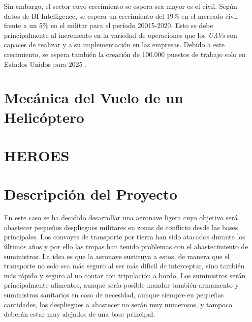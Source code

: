 Sin embargo, el sector cuyo crecimiento se espera sea mayor es el civil. Según datos de BI Intelligence, se espera un crecimiento del 19\% en el mercado civil frente a un 5\% en el militar para el período 20015-2020.
Esto se debe principalmente al incremento en la variedad de operaciones que los \emph{UAVs} son capaces de realizar y a su implementación en las empresas. Debido a este crecimiento, se espera también la creación de 100.000 puestos de trabajo solo en Estados Unidos para 2025 \cite{AUVSI}.\\

\section{Mecánica del Vuelo de un Helicóptero}


\section[\textbf{HE}licopter and \textbf{RO}tor \textbf{E}quilibrium and \textbf{S}tability toolbox]{HEROES}


\section{Descripción del Proyecto}

En este caso se ha decidido desarrollar una aeronave ligera cuyo objetivo será abastecer pequeños despliegues militares en zonas de conflicto desde las bases principales. Los convoyes de transporte por tierra han sido atacados durante los últimos años y por ello las tropas han tenido problemas con el abastecimiento de suministros. La idea es que la aeronave sustituya a estos, de manera que el transporte no solo sea más seguro al ser más difícil de interceptar, sino también más rápido y seguro al no contar con tripulación a bordo. 
Los suministros serán principalmente alimentos, aunque sería posible mandar también armamento y suministros sanitarios en caso de necesidad, aunque siempre en pequeñas cantidades, los despliegues a abastecer no serán muy numerosos, y tampoco deberán estar muy alejados de una base principal.

